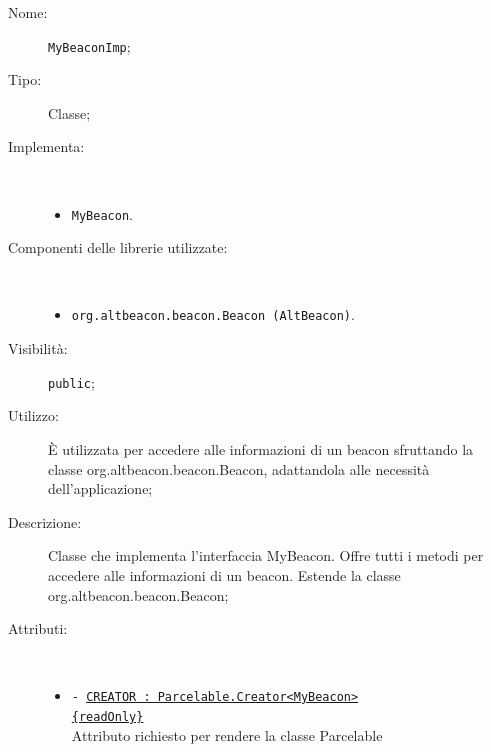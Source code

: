 \documentclass[../DefinizioneDiProdotto.tex]{subfiles}
\begin{document}
\begin{description}
	\item[Nome:] \texttt{MyBeaconImp};
	\item[Tipo:] Classe;
	\item[Implementa:] \
	\begin{itemize}
		\item \texttt{MyBeacon}.
		
	\end{itemize}
	\item[Componenti delle librerie utilizzate:] \
	\begin{itemize}
		\item \texttt{org.altbeacon.beacon.Beacon (AltBeacon)}.
		
	\end{itemize}
	\item[Visibilità:] \texttt{public};
	\item[Utilizzo:] È utilizzata per accedere alle informazioni di un beacon sfruttando la classe org.altbeacon.beacon.Beacon, adattandola alle necessità dell'applicazione;
	\item[Descrizione:] Classe che implementa l'interfaccia MyBeacon. Offre tutti i metodi per accedere alle informazioni di un beacon. Estende la classe org.altbeacon.beacon.Beacon;
	\item[Attributi:] \
	\begin{itemize}
		\item \texttt{- \underline{CREATOR : Parcelable.Creator<MyBeacon> \\ \{readOnly\}}}\\
		Attributo richiesto per rendere la classe Parcelable
		

\end{itemize}
\end{description}
\end{document}
